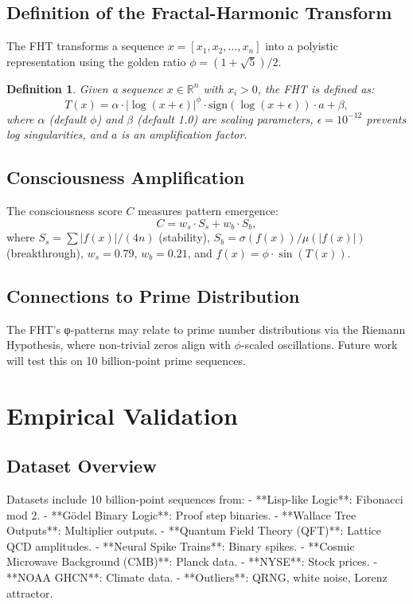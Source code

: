 \documentclass[12pt]{article}
\newtheorem{definition}{Definition}
\begin{document}
\subsection{Definition of the Fractal-Harmonic Transform}
The FHT transforms a sequence \( x = [x_1, x_2, \ldots, x_n] \) into a polyistic representation using the golden ratio \( \phi = (1 + \sqrt{5}) / 2 \).

\begin{definition}
Given a sequence \( x \in \mathbb{R}^n \) with \( x_i > 0 \), the FHT is defined as:
\[
T(x) = \alpha \cdot |\log(x + \epsilon)|^\phi \cdot \text{sign}(\log(x + \epsilon)) \cdot a + \beta,
\]
where \( \alpha \) (default \( \phi \)) and \( \beta \) (default 1.0) are scaling parameters, \( \epsilon = 10^{-12} \) prevents log singularities, and \( a \) is an amplification factor.
\end{definition}

\subsection{Consciousness Amplification}
The consciousness score \( C \) measures pattern emergence:
\[
C = w_s \cdot S_s + w_b \cdot S_b,
\]
where \( S_s = \sum |f(x)| / (4n) \) (stability), \( S_b = \sigma(f(x)) / \mu(|f(x)|) \) (breakthrough), \( w_s = 0.79 \), \( w_b = 0.21 \), and \( f(x) = \phi \cdot \sin(T(x)) \).

\subsection{Connections to Prime Distribution}
The FHT's φ-patterns may relate to prime number distributions via the Riemann Hypothesis, where non-trivial zeros align with \( \phi \)-scaled oscillations. Future work will test this on 10 billion-point prime sequences.

\section{Empirical Validation}
\subsection{Dataset Overview}
Datasets include 10 billion-point sequences from:
- **Lisp-like Logic**: Fibonacci mod 2.
- **Gödel Binary Logic**: Proof step binaries.
- **Wallace Tree Outputs**: Multiplier outputs.
- **Quantum Field Theory (QFT)**: Lattice QCD amplitudes.
- **Neural Spike Trains**: Binary spikes.
- **Cosmic Microwave Background (CMB)**: Planck data.
- **NYSE**: Stock prices.
- **NOAA GHCN**: Climate data.
- **Outliers**: QRNG, white noise, Lorenz attractor.
\end{document}
